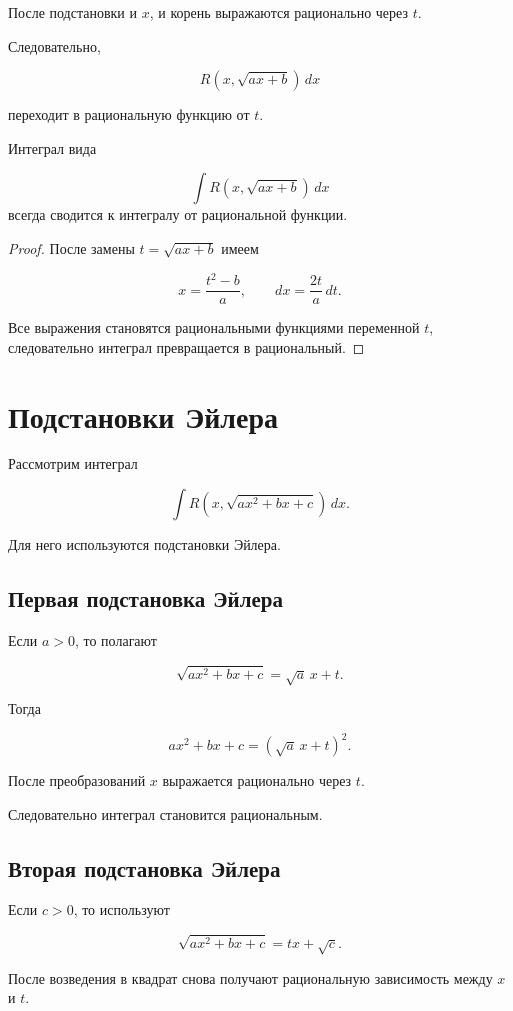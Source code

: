 \documentclass[14pt]{extreport}
\begin{document}
После подстановки и $x$, и корень выражаются рационально через $t$.

Следовательно,

\[
R(x,\sqrt{ax+b})\,dx
\]

переходит в рациональную функцию от $t$.
\newpage
\begin{theorem}
Интеграл вида

\[
\int R(x,\sqrt{ax+b})\,dx
\]
всегда сводится к интегралу от рациональной функции.
\end{theorem}

\begin{proof}

После замены
$t=\sqrt{ax+b}$
имеем

\[
x=\frac{t^2-b}{a},
\qquad
dx=\frac{2t}{a}\,dt.
\]

Все выражения становятся рациональными функциями переменной $t$,
следовательно интеграл превращается в рациональный.
\end{proof}

\section{Подстановки Эйлера}

Рассмотрим интеграл

\[
\int R\left(x,\sqrt{ax^2+bx+c}\right)\,dx.
\]

Для него используются подстановки Эйлера.

\subsection{Первая подстановка Эйлера}

Если $a>0$, то полагают

\[
\sqrt{ax^2+bx+c}
=
\sqrt a\,x+t.
\]

Тогда

\[
ax^2+bx+c=(\sqrt a\,x+t)^2.
\]

После преобразований $x$ выражается рационально через $t$.

Следовательно интеграл становится рациональным.

\subsection{Вторая подстановка Эйлера}

Если $c>0$, то используют

\[
\sqrt{ax^2+bx+c}
=
tx+\sqrt c.
\]

После возведения в квадрат снова получают рациональную зависимость
между $x$ и $t$.
\end{document}
